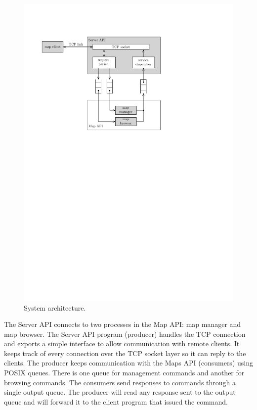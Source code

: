 \documentclass[10pt]{article}
\begin{document}
\begin{figure}[h]
\includegraphics[scale=0.99]{system_arch.pdf}

\caption{System architecture.\label{fig:System-architecture}}

\end{figure}

The Server API connects to two processes in the Map API: map manager and map
browser. The Server API program (producer) handles the TCP connection and
exports a simple interface to allow communication with remote clients. It keeps
track of every connection over the TCP socket layer so it can reply to the
clients. The producer keeps communication with the Maps API (consumers) using
POSIX queues. There is one queue for management commands and another for
browsing commands. The consumers send responses to commands through a single
output queue. The producer will read any response sent to the output queue and
will forward it to the client program that issued the command. 
\end{document}
